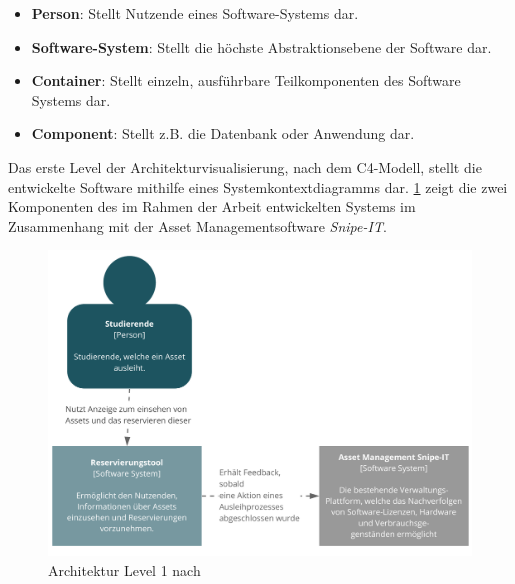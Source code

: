 \begin{itemize}
    \item \textbf{Person}: Stellt Nutzende eines Software-Systems dar.
    \item \textbf{Software-System}: Stellt die höchste Abstraktionsebene der Software dar.
    \item \textbf{Container}: Stellt einzeln, ausführbare Teilkomponenten des Software Systems dar.
    \item \textbf{Component}: Stellt z.B. die Datenbank oder Anwendung dar.
\end{itemize}

{\sffamily\color{maincolor}{Level 1: Context}}

Das erste Level der Architekturvisualisierung, nach dem C4-Modell, stellt die entwickelte Software
mithilfe eines Systemkontextdiagramms dar. \ref{fig:level1} zeigt die zwei Komponenten des im Rahmen
der Arbeit entwickelten Systems im Zusammenhang mit der Asset Managementsoftware \textit{Snipe-IT}.

\begin{figure}[h]
    \centering
    \includegraphics[scale=0.4]{Bilder/level1.pdf}
    \caption[Architektur Level 1]{Architektur Level 1 nach }
    \label{fig:level1}
\end{figure}

